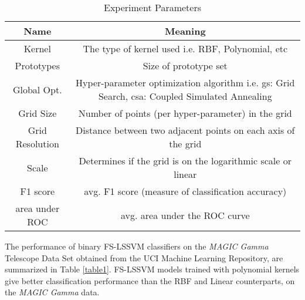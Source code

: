 \documentclass[conference, cmex10]{IEEEtran}
\begin{document}
\begin{table*}[!htbp]
\caption{Experiment Parameters}
\label{table:param}
\centering
\begin{tabular}{ |c|c| }
\hline
Name & Meaning \\
\hline
Kernel & The type of kernel used i.e. RBF, Polynomial, etc \\ 
Prototypes & Size of prototype set \\ 
Global Opt. & Hyper-parameter optimization algorithm i.e. gs: Grid Search, csa: Coupled Simulated Annealing \\
Grid Size & Number of points (per hyper-parameter) in the grid  \\
Grid Resolution & Distance between two adjacent points on each axis of the grid \\
Scale & Determines if the grid is on the logarithmic scale or linear \\
F1 score & avg. F1 score (measure of classification accuracy) \\
area under ROC & avg. area under the ROC curve \\
\hline
\end{tabular}
\end{table*}



The performance of binary FS-LSSVM classifiers on the \textit{MAGIC Gamma} Telescope Data Set obtained from the UCI Machine Learning Repository, are summarized in Table \ref{table1}. FS-LSSVM models trained with polynomial kernels give better classification performance than the RBF and Linear counterparts, on the \textit{MAGIC Gamma} data.
\end{document}
